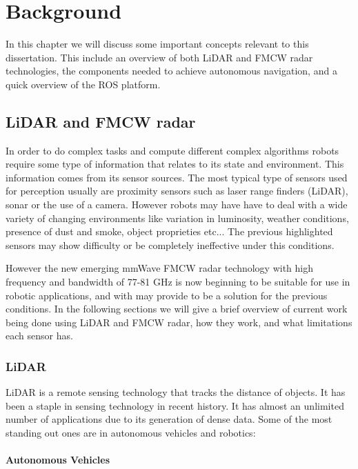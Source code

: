 \chapter{Background} \label{ch:Concepts}

In this chapter we will discuss some important concepts relevant to this dissertation. This include an overview of both \ac{LiDAR} and \ac{FMCW} radar technologies, the components needed to achieve autonomous navigation,  and a quick overview of the \ac{ROS} platform.

\section{\ac{LiDAR} and \ac{FMCW} \ac{radar}}
In order to do complex tasks and compute different complex algorithms robots require some type of information that relates to its state and environment. This information comes from its sensor sources.
The most typical type of sensors used for perception usually are proximity sensors such as laser range finders (\ac{LiDAR}), sonar or the use of a camera. However robots may have have to deal with a wide variety of changing environments like variation in luminosity, weather conditions, presence of dust and smoke, object proprieties etc... The previous highlighted sensors may show difficulty or be completely ineffective under this conditions.

However the new emerging \ac{mmWave} \ac{FMCW} radar technology with high frequency and bandwidth of 77-81 GHz is now beginning to be suitable for use in robotic applications, and with may provide to be a solution for the previous conditions. In the following  sections we will give a brief overview of current work being done using \ac{LiDAR} and \ac{FMCW} \ac{radar}, how they work, and what limitations each sensor has.

\subsection{LiDAR}

\ac{LiDAR} is a remote sensing technology that tracks the distance of objects. It has been a staple in sensing technology in recent history. It has almost an  unlimited  number of applications \cite{lidar100uses} due to its generation of dense data. Some of the most standing out ones are in autonomous vehicles and robotics:
\subsubsection*{Autonomous Vehicles}

